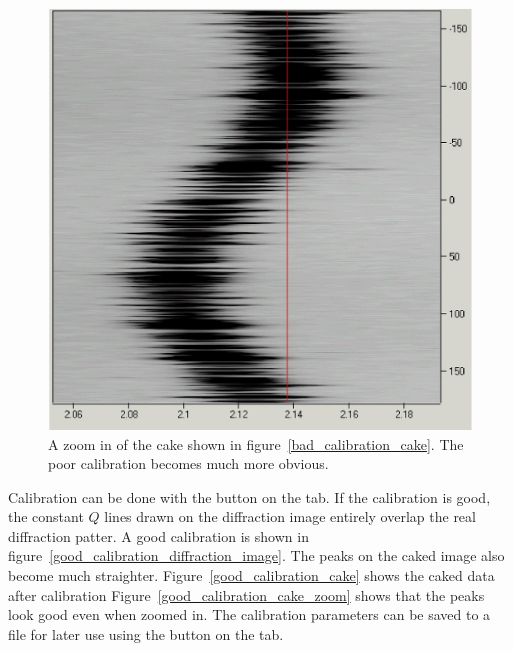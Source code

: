 \begin{figure}
    \centering
    \includegraphics[scale=.75]
    {figures/bad_calibration_cake_zoom.eps}
    \caption{A zoom in of the cake shown in 
    figure~\ref{bad_calibration_cake}. The poor calibration 
    becomes much more obvious.}
    \label{bad_calibration_cake_zoom}
\end{figure}

Calibration can be done with the  button 
on the  tab. If the calibration is good, 
the constant $Q$ lines drawn on the diffraction image 
entirely overlap the real diffraction patter. 
A good calibration is shown in 
figure~\ref{good_calibration_diffraction_image}.
The peaks on the caked image also become much straighter.
Figure~\ref{good_calibration_cake} shows the caked data after calibration 
Figure~\ref{good_calibration_cake_zoom} shows that the peaks
look good even when zoomed in.
The calibration parameters can be saved to 
a file for later use using the  button on the 
 tab. 

